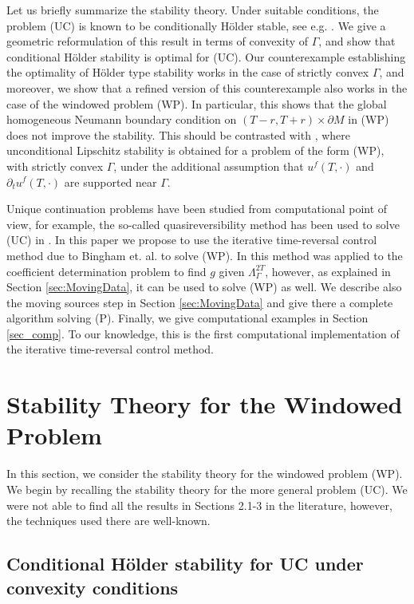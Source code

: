 \documentclass[final,leqno]{siamart1116}
\begin{document}
Let us briefly summarize the stability theory. Under suitable
conditions, the problem (UC) is known to be conditionally H\"{o}lder
stable, see e.g.  \cite[Thm. 3.2.2]{Isakov2010}. We give a geometric
reformulation of this result in terms of convexity of
$\Gamma$, and show that conditional H\"{o}lder stability is optimal
for (UC). Our counterexample establishing the optimality of H\"{o}lder
type stability works in the case of strictly convex $\Gamma$, and moreover, we
show that a refined version of this counterexample also works in the
case of the windowed problem (WP). In particular, this shows that the
global homogeneous Neumann boundary condition on $(T-r,T+r) \times {\partial} M$ in (WP)
does not improve the stability. This should be contrasted with
\cite{Bardos1996}, where unconditional Lipschitz stability is obtained
for a problem of the form (WP),
with strictly convex $\Gamma$, under the additional assumption
that $u^f(T,\cdot)$ and ${\partial}_t u^f(T,\cdot)$ are supported near $\Gamma$.

Unique continuation problems have been studied from computational point of view, for example, the so-called quasireversibility method has been used to solve (UC) in \cite{Klibanov1992}. 
In this paper we propose to use the iterative time-reversal control method due to Bingham et. al. \cite{Bingham2008} to solve (WP). 
In \cite{Bingham2008} this method was applied to the coefficient determination problem to find $g$ given $\Lambda_\Gamma^{2T}$, however, as explained in Section \ref{sec:MovingData}, it can be used to solve (WP) as well.
We describe also the moving sources step in Section \ref{sec:MovingData} 
and give there a complete algorithm solving (P). 
Finally, we give computational examples in Section \ref{sec_comp}.
To our knowledge, this is the first computational implementation of the iterative time-reversal control method.

\section{Stability Theory for the Windowed Problem}

\label{sec:Stability}

In this section, we consider the stability theory for the windowed
problem (WP). We begin by recalling the stability theory for the more
general problem (UC). We were not able to find all the results in
Sections 2.1-3 in the literature, however, the techniques used there
are well-known.

\subsection{Conditional H\"older stability for UC under convexity conditions}
\end{document}
